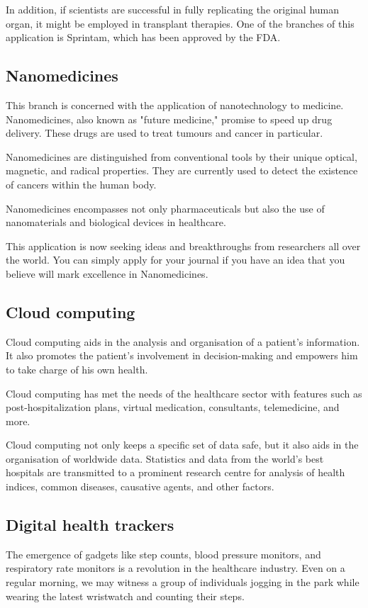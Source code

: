 \documentclass[15pt]{article}
\begin{document}
In addition, if scientists are successful in fully replicating the 
original human organ, it might be employed in transplant therapies. 
One of the branches of this application is Sprintam, which has been 
approved by the FDA.

\subsection{Nanomedicines}
This branch is concerned with the application of nanotechnology to 
medicine. Nanomedicines, also known as "future medicine," promise to
speed up drug delivery. These drugs are used to treat tumours and 
cancer in particular.

Nanomedicines are distinguished from conventional tools by their 
unique optical, magnetic, and radical properties. They are currently
used to detect the existence of cancers within the human body.

Nanomedicines encompasses not only pharmaceuticals but also the use 
of nanomaterials and biological devices in healthcare.

This application is now seeking ideas and breakthroughs from 
researchers all over the world. You can simply apply for your journal
if you have an idea that you believe will mark excellence in 
Nanomedicines.

\subsection{Cloud computing}
Cloud computing aids in the analysis and organisation of a patient's
information. It also promotes the patient's involvement in 
decision-making and empowers him to take charge of his own health.

Cloud computing has met the needs of the healthcare sector with 
features such as post-hospitalization plans, virtual medication, 
consultants, telemedicine, and more.

Cloud computing not only keeps a specific set of data safe, but it 
also aids in the organisation of worldwide data. Statistics and data
from the world's best hospitals are transmitted to a prominent 
research centre for analysis of health indices, common diseases, 
causative agents, and other factors.

\subsection{Digital health trackers}
The emergence of gadgets like step counts, blood pressure monitors, 
and respiratory rate monitors is a revolution in the healthcare 
industry. Even on a regular morning, we may witness a group of 
individuals jogging in the park while wearing the latest wristwatch 
and counting their steps.
\end{document}
